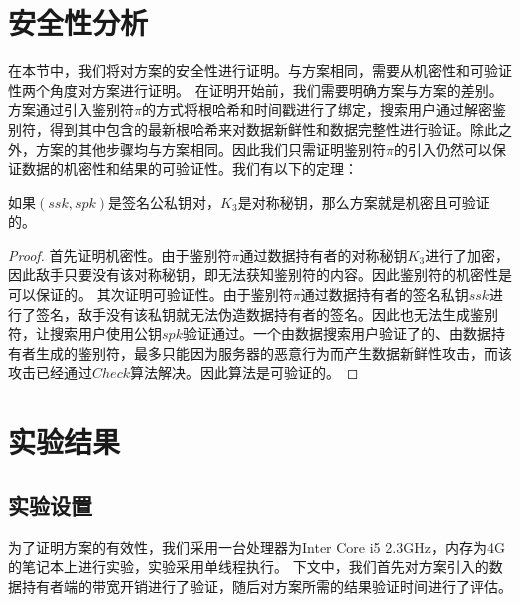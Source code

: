 \section{安全性分析}
在本节中，我们将对\multi 方案的安全性进行证明。与\single 方案相同，需要从机密性和可验证性两个角度对\multi 方案进行证明。
在证明开始前，我们需要明确\multi 方案与\single 方案的差别。\multi 方案通过引入鉴别符$\pi$的方式将根哈希和时间戳进行了绑定，搜索用户通过解密鉴别符，得到其中包含的最新根哈希来对数据新鲜性和数据完整性进行验证。除此之外，\multi 方案的其他步骤均与\single 方案相同。因此我们只需证明鉴别符$\pi$的引入仍然可以保证数据的机密性和结果的可验证性。我们有以下的定理：
\begin{theorem}
    如果$(ssk,spk)$是签名公私钥对，$K_3$是对称秘钥，那么\multi 方案就是机密且可验证的。
\end{theorem}

\begin{proof}
    首先证明机密性。由于鉴别符$\pi$通过数据持有者的对称秘钥$K_3$进行了加密，因此敌手只要没有该对称秘钥，即无法获知鉴别符的内容。因此鉴别符的机密性是可以保证的。
    其次证明可验证性。由于鉴别符$\pi$通过数据持有者的签名私钥$ssk$进行了签名，敌手没有该私钥就无法伪造数据持有者的签名。因此也无法生成鉴别符，让搜索用户使用公钥$spk$验证通过。一个由数据搜索用户验证了的、由数据持有者生成的鉴别符，最多只能因为服务器的恶意行为而产生数据新鲜性攻击，而该攻击已经通过$Check$算法解决。因此\multi 算法是可验证的。
\end{proof}

\section{实验结果}
\subsection{实验设置}
为了证明\multi 方案的有效性，我们采用一台处理器为Inter Core i5 2.3GHz，内存为4G的笔记本上进行实验，实验采用单线程执行。
下文中，我们首先对\multi 方案引入的数据持有者端的带宽开销进行了验证，随后对\multi 方案所需的结果验证时间进行了评估。
